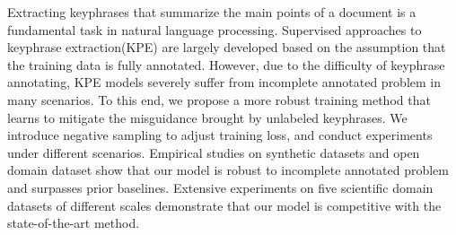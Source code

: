 Extracting keyphrases that summarize the main points of a document is a fundamental task in natural language processing. Supervised approaches to keyphrase extraction(KPE) are largely developed based on the assumption that the training data is fully annotated. However, due to the difficulty of keyphrase annotating, KPE models severely suffer from incomplete annotated problem in many scenarios. To this end, we propose a more robust training method that learns to mitigate the misguidance brought by unlabeled keyphrases. We introduce negative sampling to adjust training loss, and conduct experiments under different scenarios.  Empirical studies on synthetic datasets and open domain dataset show that our model is robust to incomplete annotated problem and surpasses prior baselines. Extensive experiments on five scientific domain datasets of different scales demonstrate that our model is competitive with the state-of-the-art method.
